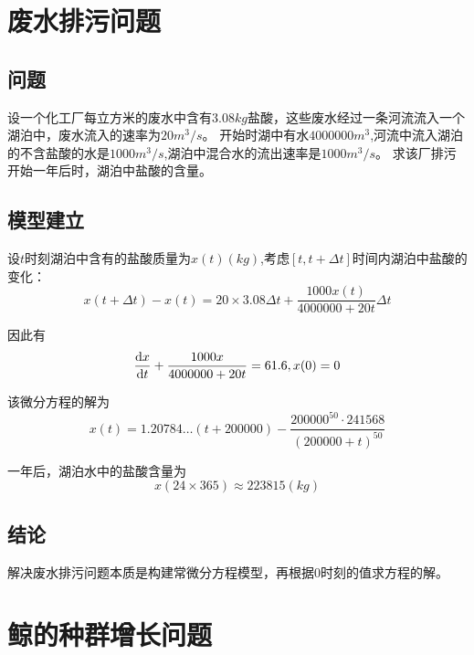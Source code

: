 \documentclass[UTF8]{ctexart}
\begin{document}
    \newpage
    \section{废水排污问题}
    \setcounter{equation}{0}
    \setcounter{figure}{0}
    \subsection{问题}
    设一个化工厂每立方米的废水中含有$3.08kg$盐酸，这些废水经过一条河流流入一个湖泊中，废水流入的速率为$20m^3/s$。
    开始时湖中有水$4000000m^3$,河流中流入湖泊的不含盐酸的水是$1000m^3/s$,湖泊中混合水的流出速率是$1000m^3/s$。
    求该厂排污开始一年后时，湖泊中盐酸的含量。
	
    \subsection{模型建立}
    设$t$时刻湖泊中含有的盐酸质量为$x(t)(kg)$,考虑$[t,t+\Delta t]$时间内湖泊中盐酸的变化：
    \begin{equation}
        x(t+\Delta t)-x(t)=20 \times 3.08\Delta t + \frac{1000x(t)}{4000000+20t} \Delta t
    \end{equation}
    \par 因此有
    \begin{equation}
        \frac{\mathrm{d} x}{\mathrm{d} t}+\frac{1000x}{4000000+20t}=61.6,\\x(0)=0 
    \end{equation}
    \par 该微分方程的解为
    \begin{equation}
       x(t)=1.20784 \ldots(t+200000)-\frac{200000^{50} \cdot 241568}{(200000+t)^{50}}
    \end{equation}
    \par 一年后，湖泊水中的盐酸含量为
    \begin{equation*}
        x(24\times 365)\approx 223815(kg)
    \end{equation*}

    \subsection{结论}
    解决废水排污问题本质是构建常微分方程模型，再根据0时刻的值求方程的解。

    \newpage
    \section{鲸的种群增长问题}
    \setcounter{equation}{0}
    
\end{document}
